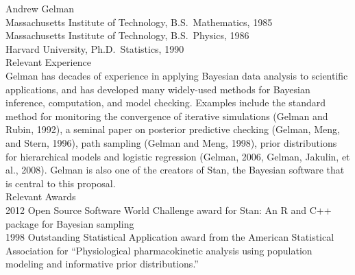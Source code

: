 \documentclass[11pt]{nih2016}
\begin{document}
{\sc Andrew Gelman}
\\[2pt]
Massachusetts Institute of Technology, B.S.\ Mathematics, 1985 \\
Massachusetts Institute of Technology, B.S.\ Physics, 1986 \\
Harvard University, Ph.D.\ Statistics, 1990
\\

\noindent
{\sc Relevant Experience}
\\[2pt]
Gelman has decades of experience in applying Bayesian data analysis to
scientific applications, and has developed many widely-used methods
for Bayesian inference, computation, and model checking. Examples
include the standard method for monitoring the convergence of
iterative simulations (Gelman and Rubin, 1992), a seminal paper on
posterior predictive checking (Gelman, Meng, and Stern, 1996), path
sampling (Gelman and Meng, 1998), prior distributions for hierarchical
models and logistic regression (Gelman, 2006, Gelman, Jakulin, et al.,
2008). Gelman is also one of the creators of Stan, the Bayesian
software that is central to this proposal.
\\

\noindent
{\sc Relevant Awards}
\\[2pt]
2012 Open Source Software World Challenge award for Stan: An R and C++
package for Bayesian sampling
\\
1998 Outstanding Statistical Application award from the American
Statistical Association for ``Physiological pharmacokinetic analysis
using population modeling and informative prior distributions.''
\\
\end{document}
